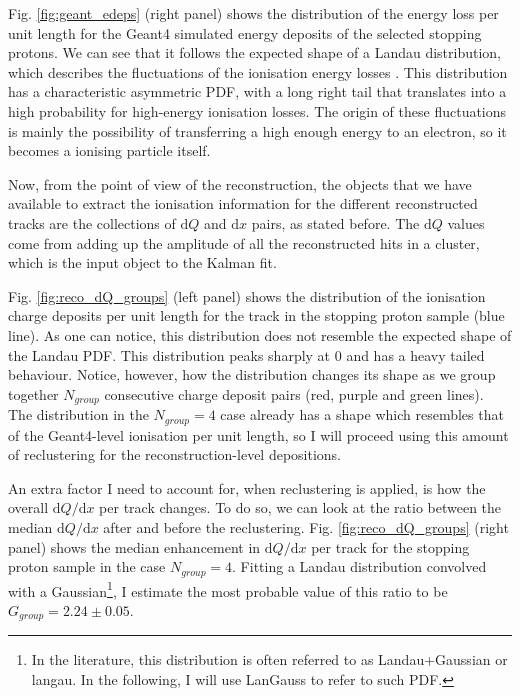 Fig. \ref{fig:geant_edeps} (right panel) shows the distribution of the energy loss per unit length for the Geant4 simulated energy deposits of the selected stopping protons. We can see that it follows the expected shape of a Landau distribution, which describes the fluctuations of the ionisation energy losses \cite{Landau1944}. This distribution has a characteristic asymmetric PDF, with a long right tail that translates into a high probability for high-energy ionisation losses. The origin of these fluctuations is mainly the possibility of transferring a high enough energy to an electron, so it becomes a ionising particle itself.

Now, from the point of view of the reconstruction, the objects that we have available to extract the ionisation information for the different reconstructed tracks are the collections of $\mathrm{d}Q$ and $\mathrm{d}x$ pairs, as stated before. The $\mathrm{d}Q$ values come from adding up the amplitude of all the reconstructed hits in a cluster, which is the input object to the Kalman fit.

Fig. \ref{fig:reco_dQ_groups} (left panel) shows the distribution of the ionisation charge deposits per unit length for the track in the stopping proton sample (blue line). As one can notice, this distribution does not resemble the expected shape of the Landau PDF. This distribution peaks sharply at $0$ and has a heavy tailed behaviour. Notice, however, how the distribution changes its shape as we group together $N_{group}$ consecutive charge deposit pairs (red, purple and green lines). The distribution in the $N_{group} = 4$ case already has a shape which resembles that of the Geant4-level ionisation per unit length, so I will proceed using this amount of reclustering for the reconstruction-level depositions.

An extra factor I need to account for, when reclustering is applied, is how the overall $\mathrm{d}Q/\mathrm{d}x$ per track changes. To do so, we can look at the ratio between the median $\mathrm{d}Q/\mathrm{d}x$ after and before the reclustering. Fig. \ref{fig:reco_dQ_groups} (right panel) shows the median enhancement in $\mathrm{d}Q/\mathrm{d}x$ per track for the stopping proton sample in the case $N_{group}=4$. Fitting a Landau distribution convolved with a Gaussian\footnote{In the literature, this distribution is often referred to as Landau+Gaussian or langau. In the following, I will use LanGauss to refer to such PDF.}, I estimate the most probable value of this ratio to be $G_{group} = 2.24 \pm 0.05$.

